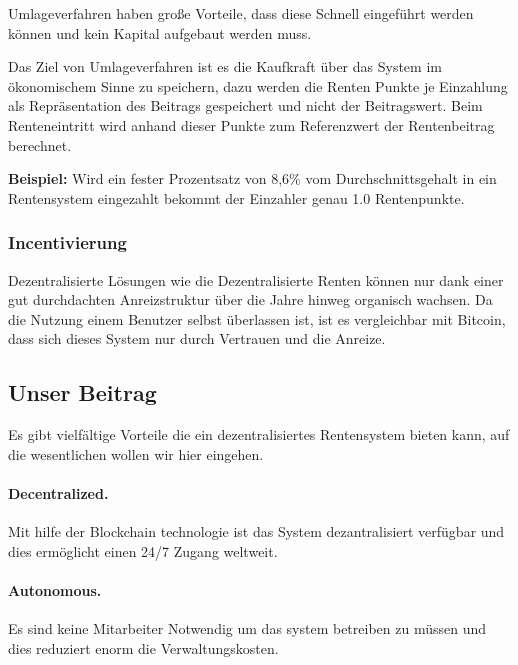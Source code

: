 Umlageverfahren haben große Vorteile, dass diese Schnell eingeführt werden können und kein Kapital aufgebaut werden muss.

Das Ziel von Umlageverfahren ist es die Kaufkraft über das System im ökonomischem Sinne zu speichern, dazu werden die Renten Punkte je Einzahlung als Repräsentation des Beitrags gespeichert und nicht der Beitragswert.
Beim Renteneintritt wird anhand dieser Punkte zum Referenzwert der Rentenbeitrag berechnet. 

\textbf{Beispiel:} Wird ein fester Prozentsatz von 8,6\% vom Durchschnittsgehalt in ein Rentensystem eingezahlt bekommt der Einzahler genau 1.0 Rentenpunkte.


\subsubsection{Incentivierung}


Dezentralisierte Lösungen wie die Dezentralisierte Renten können nur dank einer gut durchdachten Anreizstruktur über die Jahre hinweg organisch wachsen. Da die Nutzung einem Benutzer selbst überlassen ist, ist es vergleichbar mit Bitcoin\cite{nakamoto2012bitcoin}, dass sich dieses System nur durch Vertrauen und die Anreize.


\subsection{Unser Beitrag}
Es gibt vielfältige Vorteile die ein dezentralisiertes Rentensystem bieten kann, auf die wesentlichen wollen wir hier eingehen.

\paragraph{Decentralized.} Mit hilfe der Blockchain technologie ist das System dezantralisiert verfügbar und dies ermöglicht einen 24/7 Zugang weltweit.

\paragraph{Autonomous.} Es sind keine Mitarbeiter Notwendig um das system betreiben zu müssen und dies reduziert enorm die Verwaltungskosten.

